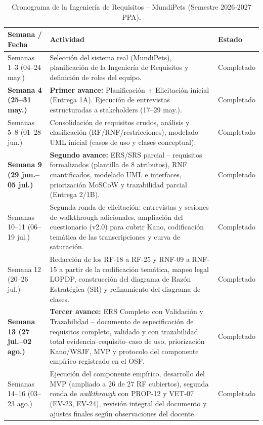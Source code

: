 \documentclass[journal,onecolumn]{IEEEtran}
\begin{document}
	\begin{table}[H]
		\caption{Cronograma de la Ingeniería de Requisitos -- MundiPets (Semestre 2026-2027 PPA).}
		\centering
		
		\begin{tabularx}{\linewidth}{|C{2.5cm}|X|C{2.8cm}|}
			\hline
			\textbf{Semana / Fecha} & \textbf{Actividad} & \textbf{Estado} \\
			\hline
			Semanas 1--3 (04--24 may.) & Selección del sistema real (MundiPets), planificación de la Ingeniería de Requisitos y definición de roles del equipo. & Completado \\
			\hline
			\textbf{Semana 4 (25--31 may.)} & \textbf{Primer avance:} Planificación + Elicitación inicial (Entrega 1A). Ejecución de entrevistas estructuradas a stakeholders (17--29 may.). & Completado \\
			\hline
			Semanas 5--8 (01--28 jun.) & Consolidación de requisitos crudos, análisis y clasificación (RF/RNF/restricciones), modelado UML inicial (casos de uso y clases conceptual). & Completado \\
			\hline
			\textbf{Semana 9 (29 jun.--05 jul.)} & \textbf{Segundo avance:} ERS/SRS parcial -- requisitos formalizados (plantilla de 8 atributos), RNF cuantificados, modelado UML e interfaces, priorización MoSCoW y trazabilidad parcial (Entrega 2/1B). & Completado \\
			\hline
			Semanas 10--11 (06--19 jul.) & Segunda ronda de elicitación: entrevistas y sesiones de walkthrough adicionales, ampliación del cuestionario (v2.0) para cubrir Kano, codificación temática de las transcripciones y curva de saturación. & Completado \\
			\hline
			Semana 12 (20--26 jul.) & Redacción de los RF-18 a RF-25 y RNF-09 a RNF-15 a partir de la codificación temática, mapeo legal LOPDP, construcción del diagrama de Razón Estratégica (SR) y refinamiento del diagrama de clases. & Completado \\
			\hline
			\textbf{Semana 13 (27 jul.--02 ago.)} & \textbf{Tercer avance:} ERS Completo con Validación y Trazabilidad -- documento de especificación de requisitos completo, validado y con trazabilidad total evidencia--requisito--caso de uso, priorización Kano/WSJF, MVP y protocolo del componente empírico registrado en el OSF. & Completado \\
			\hline
			Semanas 14--16 (03--23 ago.) & Ejecución del componente empírico, desarrollo del MVP (ampliado a 26 de 27 RF cubiertos), segunda ronda de \emph{walkthrough} con PROP-12 y VET-07 (EV-23, EV-24), revisión integral del documento y ajustes finales según observaciones del docente. & Completado \\

\end{tabularx}
\end{table}
\end{document}
